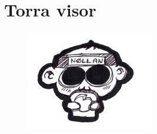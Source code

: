 
\chapter{Torra visor}

\begin{figure}[H]
    \centering
    \includegraphics[width=0.5\textwidth]{nollan_macka.png}
\end{figure}

\newpage




\newpage







\newpage